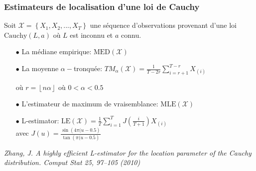 \documentclass[8pt,sans,aspectratio=169]{beamer}
\begin{document}
\begin{frame}

\frametitle{Estimateurs de localisation d'une loi de Cauchy}

Soit $\mathcal{X}=\left\{X_1,X_2,...,X_T\right\}$ une séquence d'observations provenant d'une loi $\mathrm{Cauchy}(L,a)$ où $L$ est inconnu et $a$ connu.

\vfill
\pause

\begin{itemize}

\vfill
\item[$\bullet$]
La médiane empirique: $\mathrm{MED}(\mathcal{X})$

\pause
\vfill
\item[$\bullet$]
La moyenne $\alpha-$tronquée: $\displaystyle TM_{\alpha}(\mathcal X)=\frac{1}{T-2r}\sum_{i=r+1}^{T-r}X_{(i)}$

où $r=\left\lfloor n\alpha\right\rfloor$ où $0<\alpha<0.5$ 

\pause
\vfill
\item[$\bullet$]
L'estimateur de maximum de vraisemblance: $\mathrm{MLE}(\mathcal{X})$

\pause
\vfill
\item[$\bullet$]
L-estimator: $\displaystyle\mathrm{LE}(\mathcal{X})=\frac{1}{T}\sum_{i=1}^T J\left(\frac{i}{T+1}\right) X_{(i)}$\\
avec $J(u)=\frac{\sin\left(4\pi(u-0.5\right)}{\tan\left(\pi(u-0.5\right)}$

\end{itemize}

\pause
\vfill

{\it Zhang, J. A highly efficient L-estimator for the location parameter of the Cauchy distribution. Comput Stat 25, 97–105 (2010)}

\end{frame}
\end{document}
